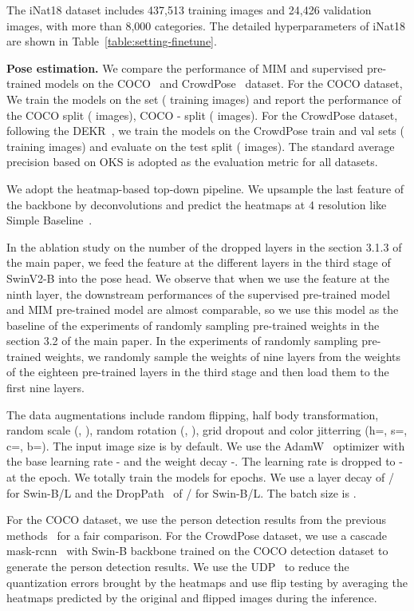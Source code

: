 \documentclass{article}
\begin{document}
The iNat18 dataset includes 437,513 training images and 24,426 validation images, with more than 8,000 categories. 
The detailed hyperparameters of iNat18 are shown in Table~\ref{table:setting-finetune}.


\noindent\textbf{Pose estimation.}
    We compare the performance of MIM and supervised pre-trained models on the COCO~\cite{lin2014microsoft} and CrowdPose~\cite{li2019crowd} dataset. For the COCO dataset, We train the models on the  set ( training images) and report the performance of the COCO  split ( images), COCO - split ( images). For the CrowdPose dataset, following the DEKR~\cite{geng2021dekr}, we train the models on the CrowdPose train and val sets ( training images) and evaluate on the test split ( images). The standard average precision based on OKS is adopted as the evaluation metric for all datasets. 
	
	We adopt the heatmap-based top-down pipeline. We upsample the last feature of the backbone by deconvolutions and predict the heatmaps at 4 resolution like Simple Baseline~\cite{xiao2018sbaseline}. 
	
	In the ablation study on the number of the dropped layers in the section 3.1.3 of the main paper, we feed the feature at the different layers in the third stage of SwinV2-B into the pose head. We observe that when we use the feature at the ninth layer, the downstream performances of the supervised pre-trained model and MIM pre-trained model are almost comparable, so we use this model as the baseline of the experiments of randomly sampling pre-trained weights in the section 3.2 of the main paper. In the experiments of randomly sampling pre-trained weights, we randomly sample the weights of nine layers from the weights of the eighteen pre-trained layers in the third stage and then load them to the first nine layers. 
	
	The data augmentations include random flipping, half body transformation, random scale (, ), random rotation (, ), grid dropout and color jitterring (h=, s=, c=, b=). The input image size is  by default. We use the AdamW~\cite{Loshchilov2019adamw} optimizer with the base learning rate - and the weight decay -. The learning rate is dropped to - at the  epoch. We totally train the models for  epochs. We use a layer decay of / for Swin-B/L and the DropPath~\cite{huang2016deep} of / for Swin-B/L.
	The batch size is .
	
    For the COCO dataset, we use the person detection results from the previous methods~\cite{sun2019hrnet, xiao2018sbaseline} for a fair comparison. For the CrowdPose dataset, we use a cascade mask-rcnn~\cite{cai2019cascadercnn} with Swin-B backbone trained on the COCO detection dataset to generate the person detection results. We use the UDP~\cite{huang2020udp} to reduce the quantization errors brought by the heatmaps and use flip testing by averaging the heatmaps predicted by the original and flipped images during the inference. 
	
\end{document}
